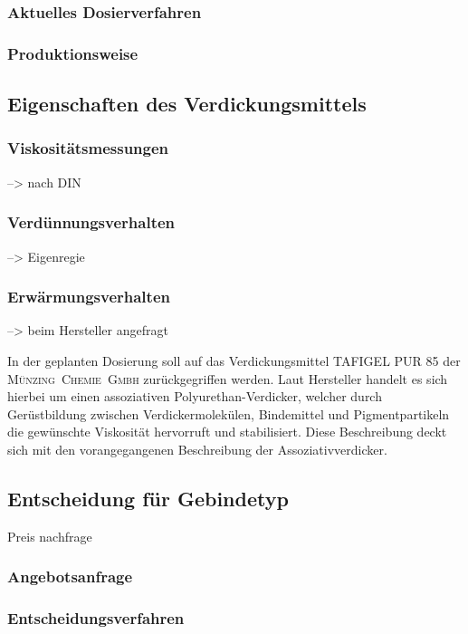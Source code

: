 \subsubsection{Aktuelles Dosierverfahren}
\subsubsection{Produktionsweise}

\subsection{Eigenschaften des Verdickungsmittels}

\subsubsection{Viskositätsmessungen}
--> nach DIN

\subsubsection{Verdünnungsverhalten}
--> Eigenregie

\subsubsection{Erwärmungsverhalten}

--> beim Hersteller angefragt

In der geplanten Dosierung soll auf das Verdickungsmittel TAFIGEL PUR 85 der \mbox{\textsc{Münzing Chemie Gmbh}} zurückgegriffen werden. Laut Hersteller handelt es sich hierbei um einen assoziativen Polyurethan-Verdicker, welcher durch Gerüstbildung zwischen Verdickermolekülen, Bindemittel und Pigmentpartikeln die gewünschte Viskosität hervorruft und stabilisiert. Diese Beschreibung deckt sich mit den vorangegangenen Beschreibung der Assoziativverdicker.\cite{MunzingChemieGmbH.2014}\\


\subsection{Entscheidung für Gebindetyp}
Preis nachfrage
\subsubsection{Angebotsanfrage}
\subsubsection{Entscheidungsverfahren}

